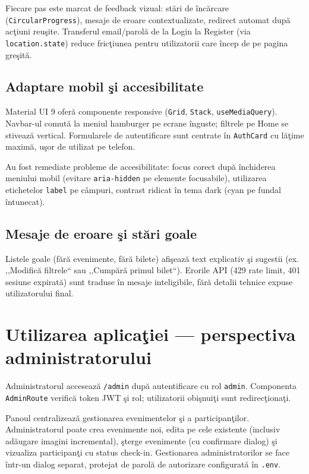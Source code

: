 Fiecare pas este marcat de feedback vizual: st\u ari de \^inc\u arcare (\texttt{CircularProgress}), mesaje de eroare contextualizate, redirect automat dup\u a ac\c tiuni reu\c site. Transferul email/\linebreak parol\u a de la Login la Register (via \texttt{location.state}) reduce fric\c tiunea pentru utilizatorii care \^incep de pe pagina gre\c sit\u a.

\subsection{Adaptare mobil \c si accesibilitate}

Material UI 9 ofer\u a componente responsive (\texttt{Grid}, \texttt{Stack}, \texttt{useMediaQuery}). Navbar-ul comut\u a la meniul hamburger pe ecrane \^inguste; filtrele pe Home se stiveaz\u a vertical. Formularele de autentificare sunt centrate \^in \texttt{AuthCard} cu l\u a\c time maxim\u a, u\c sor de utilizat pe telefon.

Au fost remediate probleme de accesibilitate: focus corect dup\u a \^inchiderea meniului mobil (evitare \texttt{aria-hidden} pe elemente focusabile), utilizarea etichetelor \texttt{label} pe c\^ampuri, contrast ridicat \^in tema dark (cyan pe fundal \^intunecat).

\subsection{Mesaje de eroare \c si st\u ari goale}

Listele goale (f\u ar\u a evenimente, f\u ar\u a bilete) afi\c seaz\u a text explicativ \c si sugestii (ex. ,,Modific\u a filtrele`` sau ,,Cump\u ar\u a primul bilet``). Erorile API (429 rate limit, 401 sesiune expirat\u a) sunt traduse \^in mesaje inteligibile, f\u ar\u a detalii tehnice expuse utilizatorului final.

\section{Utilizarea aplica\c tiei — perspectiva administratorului}

Administratorul acceseaz\u a \texttt{/admin} dup\u a autentificare cu rol \texttt{admin}. Componenta \linebreak \texttt{AdminRoute} verific\u a token JWT \c si rol; utilizatorii obi\c snui\c ti sunt redirec\c tiona\c ti.

Panoul centralizeaz\u a gestionarea evenimentelor \c si a participan\c tilor. Administratorul poate crea evenimente noi, edita pe cele existente (inclusiv ad\u augare imagini incremental), \c sterge evenimente (cu confirmare dialog) \c si vizualiza participan\c ti cu status check-in. Gestionarea administratorilor se face \^intr-un dialog separat, protejat de parol\u a de autorizare configurat\u a \^in \texttt{.env}.

